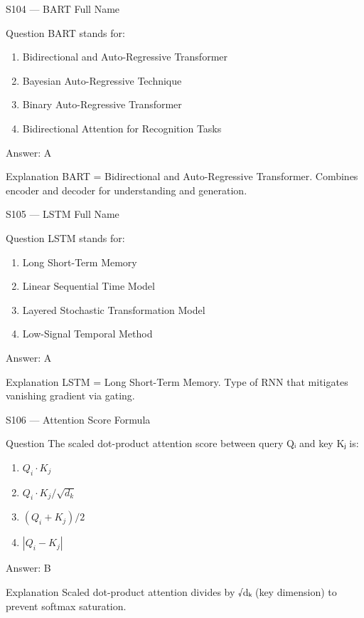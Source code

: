 \documentclass[aspectratio=169,8pt]{beamer}
\begin{document}
	\begin{frame}{S104 --- BART Full Name}
		\begin{block}{Question}
			BART stands for:
			\begin{enumerate}
				\item Bidirectional and Auto-Regressive Transformer
				\item Bayesian Auto-Regressive Technique
				\item Binary Auto-Regressive Transformer
				\item Bidirectional Attention for Recognition Tasks
			\end{enumerate}
		\end{block}
		\begin{exampleblock}{Answer: A}\end{exampleblock}
		\begin{block}{Explanation}
			BART = Bidirectional and Auto-Regressive Transformer. Combines encoder and decoder for understanding and generation.
		\end{block}
	\end{frame}
	
	\begin{frame}{S105 --- LSTM Full Name}
		\begin{block}{Question}
			LSTM stands for:
			\begin{enumerate}
				\item Long Short-Term Memory
				\item Linear Sequential Time Model
				\item Layered Stochastic Transformation Model
				\item Low-Signal Temporal Method
			\end{enumerate}
		\end{block}
		\begin{exampleblock}{Answer: A}\end{exampleblock}
		\begin{block}{Explanation}
			LSTM = Long Short-Term Memory. Type of RNN that mitigates vanishing gradient via gating.
		\end{block}
	\end{frame}
	
	\begin{frame}{S106 --- Attention Score Formula}
		\begin{block}{Question}
			The scaled dot-product attention score between query Qᵢ and key Kⱼ is:
			\begin{enumerate}
				\item $Q_i \cdot K_j$
				\item $Q_i \cdot K_j / \sqrt{d_k}$
				\item $(Q_i + K_j)/2$
				\item $|Q_i - K_j|$
			\end{enumerate}
		\end{block}
		\begin{exampleblock}{Answer: B}\end{exampleblock}
		\begin{block}{Explanation}
			Scaled dot-product attention divides by √dₖ (key dimension) to prevent softmax saturation.
		\end{block}
	\end{frame}
	
\end{document}
